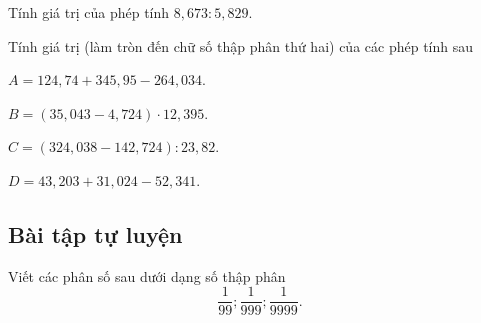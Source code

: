 \begin{vd}%
Tính giá trị của phép tính $ 8{,}673 : 5{,}829 $.
\end{vd}

\begin{vd}%
Tính giá trị (làm tròn đến chữ số thập phân thứ hai) của các phép tính sau
\begin{enumEX}[a)]{2}
	\item $ A=124{,}74+345,95-264{,}034 $.
	\item $ B=(35{,}043-4{,}724)\cdot 12{,}395 $.
	\item $ C=(324{,}038-142{,}724):23{,}82 $.
	\item $ D=43{,}203+31{,}024-52{,}341 $.
\end{enumEX}
\end{vd}

\subsection{Bài tập tự luyện}
\begin{bt}%
Viết các phân số sau dưới dạng số thập phân
$$ \dfrac{1}{99};\dfrac{1}{999};\dfrac{1}{9999}. $$
\end{bt}

